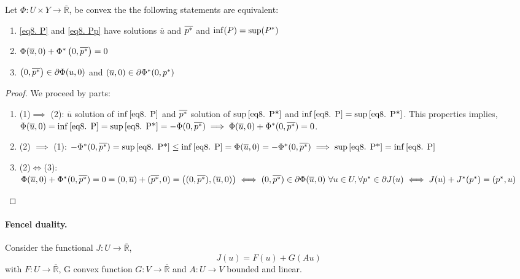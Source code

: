 \begin{theorem}
	Let $\Phi:U\times Y \rightarrow \overline{\mathbb{R}}$, be convex the the following statements are equivalent:
	
	\begin{enumerate}[]
		\item \eqref{eq8. P} and \eqref{eq8. Pp} have solutions $\overline{u}$ and $\overline{{p}^{\ast}}$ and $\inf(P)=\sup({P}^{\ast})$
		\item $\Phi(\overline{u}, 0)+{\Phi}^{\ast}\left(0, \overline{{p}^{\ast}}\right)=0$
		\item $\left(0, \overline{{p}^{\ast}}\right) \in \partial \Phi (u,0)$ and $ \left(\overline{u}, 0\right) \in \partial {\Phi}^{\ast}(0,{p}^{\ast})$
	\end{enumerate}
	\begin{proof}
		We proceed by parts:
		\begin{enumerate}
			\item (1)$\implies$ (2): $\overline{u}$ solution of $\inf\eqref{eq8. P}$ and $\overline{{p}^{\ast}}$ solution of $\sup\eqref{eq8. P*}$ and $\inf\eqref{eq8. P}=\sup\eqref{eq8. P*}$. This properties implies, $
			\Phi(\overline{u},0)=\inf\eqref{eq8. P}=\sup\eqref{eq8. P*}=-\Phi(0,\overline{{p}^{\ast}})\implies \Phi(\overline{u}, 0)+{\Phi}^{\ast}(0, \overline{{p}^{\ast}}) =0$.
			\item (2) $\implies$ (1): $-{\Phi}^{\ast}(0, \overline{{p}^{\ast}})=\sup\eqref{eq8. P*}\leq \inf\eqref{eq8. P}=\Phi(\overline{u}, 0)=-{\Phi}^{\ast}(0, \overline{{p}^{\ast}}) \implies \sup\eqref{eq8. P*}=\inf\eqref{eq8. P}$
			\item (2)$\iff$(3): $\Phi(\overline{u},0)+{\Phi}^{\ast}(0, \overline{{p}^{\ast}})=0=(0, \overline{u}) +(\overline{{p}^{\ast}},0)=\left((0, \overline{{p}^{\ast}}), (\overline{u},0)\right) \iff (0, \overline{{p}^{\ast}}) \in \partial\Phi(\overline{u},0) \ \forall u \in U,  \forall {p}^{\ast} \in \partial J(u) \iff J(u)+{J}^{\ast}({p}^{\ast})=({p}^{\ast}, u)$
		\end{enumerate}
	\end{proof}
\end{theorem}
\paragraph{Fencel duality.}
Consider the functional $J:U\rightarrow\overline{\mathbb{R}}$, 
\[
	J(u)=F(u)+G(Au)
\]
 with $F:U\rightarrow\overline{\mathbb{R}}$,  G convex function $G: V\rightarrow \overline{\mathbb{R}}$ and $A:U\rightarrow V$ bounded and linear.
 
